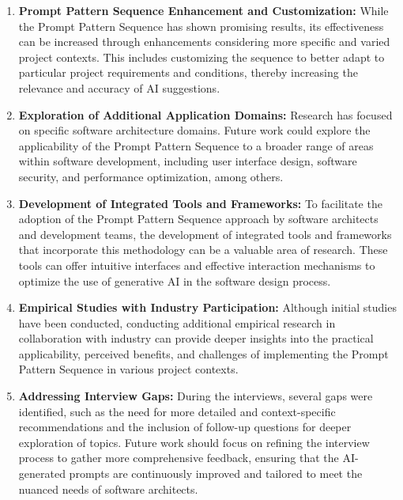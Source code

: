 \begin{enumerate}
    \item \textbf{Prompt Pattern Sequence Enhancement and Customization:} While the Prompt Pattern Sequence has shown promising results, its effectiveness can be increased through enhancements considering more specific and varied project contexts. This includes customizing the sequence to better adapt to particular project requirements and conditions, thereby increasing the relevance and accuracy of AI suggestions.
    \item \textbf{Exploration of Additional Application Domains:} Research has focused on specific software architecture domains. Future work could explore the applicability of the Prompt Pattern Sequence to a broader range of areas within software development, including user interface design, software security, and performance optimization, among others.
    \item \textbf{Development of Integrated Tools and Frameworks:} To facilitate the adoption of the Prompt Pattern Sequence approach by software architects and development teams, the development of integrated tools and frameworks that incorporate this methodology can be a valuable area of research. These tools can offer intuitive interfaces and effective interaction mechanisms to optimize the use of generative AI in the software design process.
    \item \textbf{Empirical Studies with Industry Participation:} Although initial studies have been conducted, conducting additional empirical research in collaboration with industry can provide deeper insights into the practical applicability, perceived benefits, and challenges of implementing the Prompt Pattern Sequence in various project contexts.
    \item \textbf{Addressing Interview Gaps:} During the interviews, several gaps were identified, such as the need for more detailed and context-specific recommendations and the inclusion of follow-up questions for deeper exploration of topics. Future work should focus on refining the interview process to gather more comprehensive feedback, ensuring that the AI-generated prompts are continuously improved and tailored to meet the nuanced needs of software architects.
\end{enumerate}
